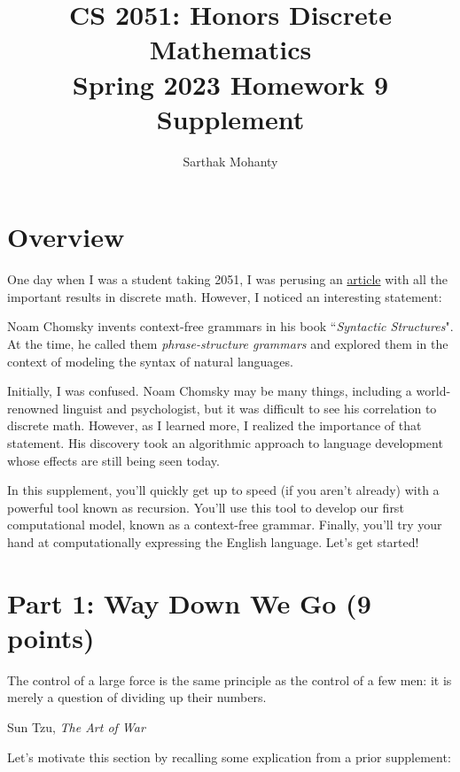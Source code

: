 \documentclass{article}
\title{\vspace{-1cm}CS 2051: Honors Discrete Mathematics \\Spring 2023 Homework 9 Supplement}
\author{Sarthak Mohanty}
\date{}
\begin{document}
\maketitle

\vspace{-1cm}
\section*{Overview}
    One day when I was a student taking 2051, I was perusing an \href{https://web.stanford.edu/class/archive/cs/cs103/cs103.1234/timeline_of_results}{article} with all the important results in discrete math. However, I noticed an interesting statement: 

    \begin{tcolorbox}[colframe=gray!20]
        Noam Chomsky invents context-free grammars in his book “\textit{Syntactic Structures}". At the time, he called them \textit{phrase-structure grammars} and explored them in the context of modeling the syntax of natural languages.
    \end{tcolorbox}
    Initially, I was confused. Noam Chomsky may be many things, including a world-renowned linguist and psychologist, but it was difficult to see his correlation to discrete math. However, as I learned more, I realized the importance of that statement. His discovery took an algorithmic approach to language development whose effects are still being seen today.

    \vspace{2mm}
    In this supplement, you'll quickly get up to speed (if you aren't already) with a powerful tool known as recursion. You'll use this tool to develop our first computational model, known as a context-free grammar. Finally, you'll try your hand at computationally expressing the English language. Let's get started!

\section*{Part 1: Way Down We Go (9 points)}
\setlength{\epigraphwidth}{0.6\textwidth}
\epigraph{The control of a large force is the same principle as the control of a few men: it is merely a question of dividing up their numbers.}{Sun Tzu, \textit{The Art of War}}
Let's motivate this section by recalling some explication from a prior supplement:
\end{document}
